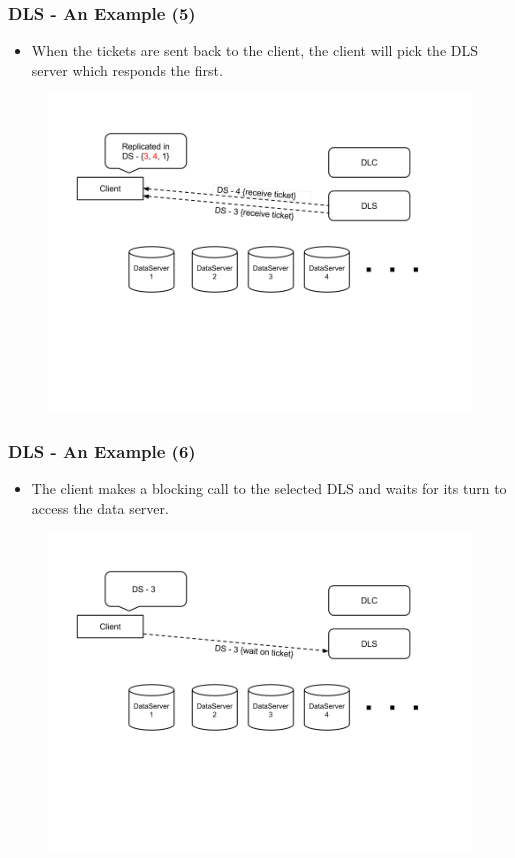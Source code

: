 \documentclass{beamer}
\begin{document}
\begin{frame}
  \frametitle{DLS - An Example (5)}
  \begin{itemize}
  \item When the tickets are sent back to the client, the client will pick
    the DLS server which responds the first.
  \end{itemize}
  \begin{figure}
    \begin{center}
      \centerline{\includegraphics[scale=0.40]{img/DLS_Example6.png}}
    \end{center}
  \end{figure}
\end{frame}

\begin{frame}
  \frametitle{DLS - An Example (6)}
  \begin{itemize}
  \item The client makes a blocking call to the selected DLS and waits for
    its turn to access the data server.
  \end{itemize}
  \begin{figure}
    \begin{center}
      \centerline{\includegraphics[scale=0.40]{img/DLS_Example7.png}}
    \end{center}
  \end{figure}
\end{frame}
\end{document}
